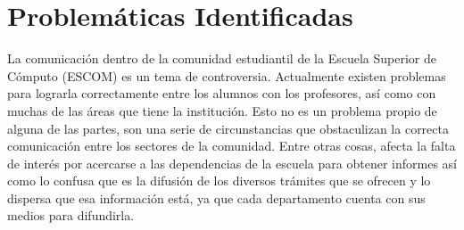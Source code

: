 	\section{Problemáticas Identificadas}



		La comunicación dentro de la comunidad estudiantil de la Escuela Superior de Cómputo (ESCOM) es un tema de controversia. Actualmente existen problemas para lograrla correctamente entre los alumnos con los profesores, así como con muchas de las áreas que tiene la institución. Esto no es un problema propio de alguna de las partes, son una serie de circunstancias que obstaculizan la correcta comunicación entre los sectores de la comunidad. Entre otras cosas, afecta la falta de interés por acercarse a las dependencias de la escuela para obtener informes así como lo confusa que es la difusión de los diversos trámites que se ofrecen y lo dispersa que esa información está, ya que cada departamento cuenta con sus medios para difundirla.\\
	
